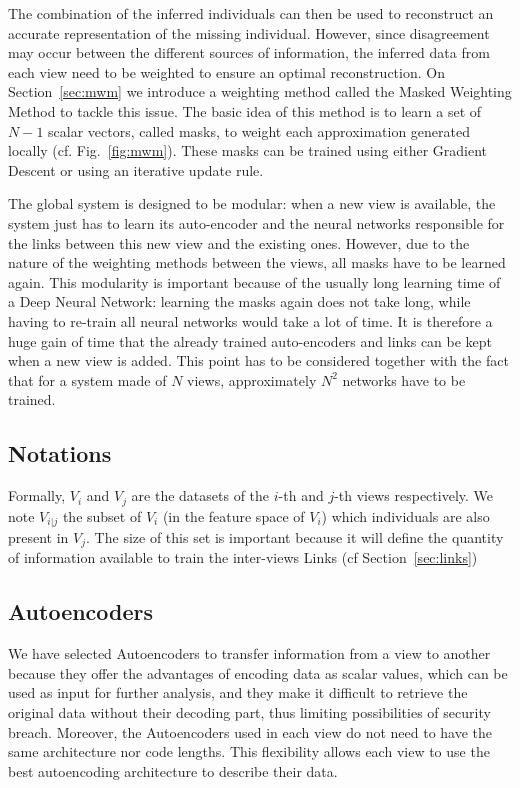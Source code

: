     The combination of the inferred individuals can then be used to reconstruct an accurate representation of the missing individual. However, since disagreement may occur between the different sources of information, the inferred data from each view need to be weighted to ensure an optimal reconstruction. On Section~\ref{sec:mwm} we introduce a weighting method called the Masked Weighting Method to tackle this issue. The basic idea of this method is to learn a set of $N-1$ scalar vectors, called masks, to weight each approximation generated locally (cf. Fig.~\ref{fig:mwm}). These masks can be trained using either Gradient Descent or using an iterative update rule.
	
The global system is designed to be modular: when a new view is available, the system just has to learn its auto-encoder and the neural networks responsible for the links between this new view and the existing ones. However, due to the nature of the weighting methods between the views, all masks have to be learned again.  This modularity is important because of the usually long learning time of a Deep Neural Network: learning the masks again does not take long, while having to re-train all neural networks would take a lot of time. It is therefore a huge gain of time that the already trained auto-encoders and links can be kept when a new view is added. This point has to be considered together with the fact that for a system made of $N$ views, approximately $N^2$ networks have to be trained.
	

\subsection{Notations}
\label{sec:precond}
Formally, $V_i$ and $V_j$ are the datasets of the $i$-th and $j$-th views respectively. We note $V_{i|j}$ the subset of $V_i$ (in the feature space of $V_i$) which individuals are also present in $V_j$. The size of this set is important because it will define the quantity of information available to train the inter-views Links (cf Section~\ref{sec:links})
	
		\subsection{Autoencoders}
\label{sec:dae}
		
We have selected Autoencoders to transfer information from a view to another because they offer the advantages of encoding data as scalar values, which can be used as input for further analysis, and they make it difficult to retrieve the original data without their decoding part, thus limiting possibilities of security breach. Moreover, the Autoencoders used in each view do not need to have the same architecture nor code lengths. This flexibility allows each view to use the best autoencoding architecture to describe their data.
		
